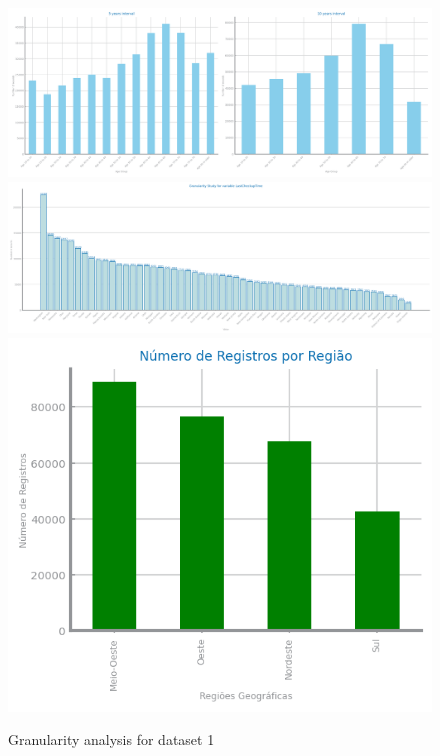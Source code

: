 \documentclass[10pt]{extarticle}
\begin{document}
\begin{figure}[H]
\centering\includegraphics[scale=0.5]{images/dataset1/data_preparation/CovidPos_AgeCategory_study_for_granularity.png}
\includegraphics[scale=0.4]{images/dataset1/data_preparation/CovidPos_State_study_for_granularity.png}
\centering\includegraphics[scale=1.0]{images/dataset1/data_preparation/CovidPos_State_per_region_study_for_granularity.png}
\caption{Granularity analysis for dataset 1}
\end{figure}
\end{document}
